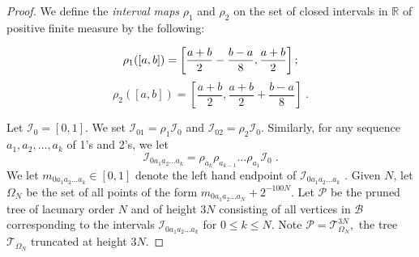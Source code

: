 \documentclass[12pt]{amsart}
\numberwithin{equation}{section}
\def\b#1{{\color{blue}#1}}
\def\r#1{{\color{red}#1}}
\theoremstyle{definition}
\theoremstyle{remark}
\def\b#1{{\color{blue}#1}}
\begin{document}
\begin{proof}

We define the \emph{interval maps} $\rho_1$ and $\rho_2$ on the set of closed intervals in $\mathbb{R}$ of positive finite measure by the following:

$$\rho_1([a,b]) = \left[\frac{a + b}{2} - \frac{b-a}{8}, \frac{a + b}{2}\right]  \textup{;}$$
$$\rho_2([a,b]) = \left[\frac{a + b}{2}, \frac{a + b}{2} + \frac{b - a}{8}\right] \;.$$

 
Let $\mathcal{I}_0 = [0,1]$.  We set $\mathcal{I}_{01}= \rho_1\mathcal{I}_0$ and $\mathcal{I}_{02} = \rho_2\mathcal{I}_0$.    Similarly, for any sequence $a_1, a_2, \ldots, a_k$ of 1's and 2's, we let
$$\mathcal{I}_{0a_1a_2\ldots a_k} = \rho_{a_k}\rho_{a_{k-1}}\ldots \rho_{a_1}\mathcal{I}_0\;.$$
We let $m_{0a_1 a_2 \ldots a_k}  \in [0,1]$ denote the left hand endpoint of $ \mathcal{I}_{0a_1a_2\ldots a_k}$  .   Given $N$, let $\Omega_N$ be   the set of all points of the form $m_{0a_1 a_2 \ldots a_N} + 2^{-100N}$.   Let $\mathscr{P}$ be the pruned tree of lacunary order $N$ and of height $3N$ consisting of all vertices in $\mathscr{B}$ corresponding to the intervals $\mathcal{I}_{0a_1a_2\ldots a_k}$ for $0 \leq k \leq N$.  Note $\mathscr{P} =  \mathscr{T}_{\Omega_N}^{3N},$ the tree $\mathscr{T}_{\Omega_N}$ truncated at height $3N$.



\end{proof}
\end{document}
